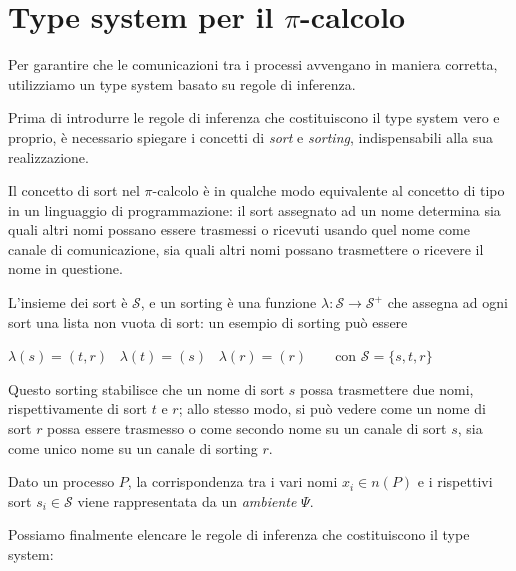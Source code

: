 \section{Type system per il \texorpdfstring{$\pi$}{pi}-calcolo}

Per garantire che le comunicazioni tra i processi avvengano in maniera
corretta, utilizziamo un type system basato su regole di
inferenza\cite{quagliawalker05}.

Prima di introdurre le regole di inferenza che costituiscono il type system
vero e proprio, \`e necessario spiegare i concetti di \emph{sort} e
\emph{sorting}, indispensabili alla sua realizzazione.

Il concetto di sort nel $\pi$-calcolo \`e in qualche modo equivalente al
concetto di tipo in un linguaggio di programmazione: il sort assegnato ad un
nome determina sia quali altri nomi possano essere trasmessi o ricevuti usando
quel nome come canale di comunicazione, sia quali altri nomi possano
trasmettere o ricevere il nome in questione.

L'insieme dei sort \`e $\mathcal{S}$, e un sorting \`e una funzione
$\lambda : \mathcal{S} \rightarrow \mathcal{S}^{+}$ che assegna ad ogni sort
una lista non vuota di sort: un esempio di sorting pu\`o essere

\begin{pilisting}
$
    \lambda(s) = (t,r) \;\;\;
    \lambda(t) = (s)   \;\;\;
    \lambda(r) = (r)   \;\;\;\;\;\;
$
con $\mathcal{S} = \{s,t,r\}$
\end{pilisting}

Questo sorting stabilisce che un nome di sort $s$ possa trasmettere due
nomi, rispettivamente di sort $t$ e $r$; allo stesso modo, si pu\`o vedere
come un nome di sort $r$ possa essere trasmesso o come secondo nome su un
canale di sort $s$, sia come unico nome su un canale di sorting $r$.

Dato un processo $P$, la corrispondenza tra i vari nomi $x_i \in n(P)$ e
i rispettivi sort $s_i \in \mathcal{S}$ viene rappresentata da un
\emph{ambiente} $\Psi$.

Possiamo finalmente elencare le regole di inferenza che costituiscono il
type system:

